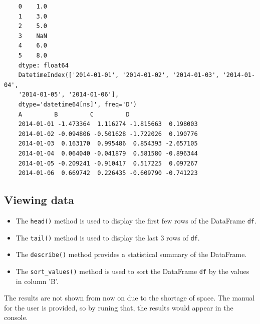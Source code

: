 \begin{code}[h!]
	    
	
	\caption{Object Creation Example}
	
\end{code}

\begin{verbatim}
	0    1.0
	1    3.0
	2    5.0
	3    NaN
	4    6.0
	5    8.0
	dtype: float64
	DatetimeIndex(['2014-01-01', '2014-01-02', '2014-01-03', '2014-01-04',
	'2014-01-05', '2014-01-06'],
	dtype='datetime64[ns]', freq='D')
	A         B         C         D
	2014-01-01 -1.473364  1.116274 -1.815663  0.198003
	2014-01-02 -0.094806 -0.501628 -1.722026  0.190776
	2014-01-03  0.163170  0.995486  0.854393 -2.657105
	2014-01-04  0.064040 -0.041879  0.581580 -0.896344
	2014-01-05 -0.209241 -0.910417  0.517225  0.097267
	2014-01-06  0.669742  0.226435 -0.609790 -0.741223
\end{verbatim}

\subsection{Viewing data}

\begin{itemize}
	
	\item The \texttt{head()} method is used to display the first few rows of the DataFrame \texttt{df}.
	
	\item The \texttt{tail()} method is used to display the last 3 rows of \texttt{df}.
	
	\item The \texttt{describe()} method provides a statistical summary of the DataFrame.
	
	\item The \texttt{sort\_values()} method is used to sort the DataFrame \texttt{df} by the values in column 'B'.
	
\end{itemize}

\begin{code}[h!]
	    
	
	\caption{Viewing Data}
	
\end{code}

The results are not shown from now on due to the shortage of space. The manual for the user is provided, so by runing that, the results would appear in the console.

